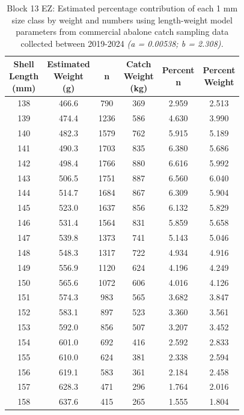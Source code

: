 \documentclass[
]{article}
\begin{document}
\begin{longtable}[t]{cccccc}
\caption{\label{tab:weightnumbercontribution}Block 13 EZ: Estimated percentage contribution of each 1 mm size class by weight and numbers using length-weight model parameters from commercial abalone catch sampling data collected between 2019-2024\textit{ (a = 0.00538; b = 2.308).}}\\
\toprule
\makecell[c]{Shell\\Length\\(mm)} & \makecell[c]{Estimated\\Weight\\(g)} & n & \makecell[c]{Catch\\Weight\\(kg)} & \makecell[c]{Percent\\n} & \makecell[c]{Percent\\Weight}\\
\midrule
138 & 466.6 & 790 & 369 & 2.959 & 2.513\\
139 & 474.4 & 1236 & 586 & 4.630 & 3.990\\
140 & 482.3 & 1579 & 762 & 5.915 & 5.189\\
141 & 490.3 & 1703 & 835 & 6.380 & 5.686\\
142 & 498.4 & 1766 & 880 & 6.616 & 5.992\\
143 & 506.5 & 1751 & 887 & 6.560 & 6.040\\
144 & 514.7 & 1684 & 867 & 6.309 & 5.904\\
145 & 523.0 & 1637 & 856 & 6.132 & 5.829\\
146 & 531.4 & 1564 & 831 & 5.859 & 5.658\\
147 & 539.8 & 1373 & 741 & 5.143 & 5.046\\
148 & 548.3 & 1317 & 722 & 4.934 & 4.916\\
149 & 556.9 & 1120 & 624 & 4.196 & 4.249\\
150 & 565.6 & 1072 & 606 & 4.016 & 4.126\\
151 & 574.3 & 983 & 565 & 3.682 & 3.847\\
152 & 583.1 & 897 & 523 & 3.360 & 3.561\\
153 & 592.0 & 856 & 507 & 3.207 & 3.452\\
154 & 601.0 & 692 & 416 & 2.592 & 2.833\\
155 & 610.0 & 624 & 381 & 2.338 & 2.594\\
156 & 619.1 & 583 & 361 & 2.184 & 2.458\\
157 & 628.3 & 471 & 296 & 1.764 & 2.016\\
158 & 637.6 & 415 & 265 & 1.555 & 1.804\\

\end{longtable}
\end{document}
